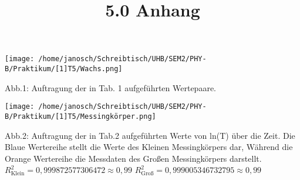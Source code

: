 \documentclass[11pt]{article}
\begin{document}
\title{5.0 Anhang}
\maketitle
\texttt{[image: /home/janosch/Schreibtisch/UHB/SEM2/PHY-B/Praktikum/[1]T5/Wachs.png]}
\begin{flushleft}
\small Abb.1: Auftragung der in Tab. 1 aufgeführten Wertepaare.
\end{flushleft}
\texttt{[image: /home/janosch/Schreibtisch/UHB/SEM2/PHY-B/Praktikum/[1]T5/Messingkörper.png]}
\begin{flushleft}
\small Abb.2: Auftragung der in Tab.2 aufgeführten Werte von ln(T) über die Zeit. Die Blaue Wertereihe stellt die Werte des Kleinen Messingkörpers dar, Während die Orange Wertereihe die Messdaten des Großen Messingkörpers darstellt.\\
$R^2_{\text{Klein}}=0,999872577306472\approx 0,99$ $R^2_{\text{Groß}}=0,999005346732795\approx 0,99$
\end{flushleft}
\end{document}
